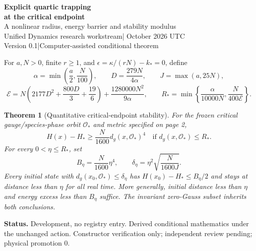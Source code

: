 \documentclass[11pt,a4paper]{article}
\newtheorem{theorem}{Theorem}\newtheorem{lemma}[theorem]{Lemma}
\begin{document}
\begin{center}
{\Large\bfseries Explicit quartic trapping\\at the critical endpoint}\\[10pt]
{\large A nonlinear radius, energy barrier and stability modulus}\\[10pt]
Unified Dynamics research workstream\quad | October 2026 UTC\\
Version 0.1\quad |\quad Computer-assisted conditional theorem
\end{center}
\begin{abstract}
At the zero-offset critical orbit, three missing quadratic directions are stabilized by the frozen positive relaxed quartic. We convert that qualitative statement into explicit orbit-distance coercivity on the full fixed-norm phase space, at every finite rank. Two new rigorous matrix bounds control the fast scalar Hessian and the metric size of critical coordinates. Global fourth and fifth geodesic derivatives, polarization and a quantitative completion of the fast variables give an explicit radius without requiring a numerical gauge-slice chart radius. The conserved-energy barrier then gives an initial perturbation modulus proportional to the square of the target distance. The constants are conservative sufficient guarantees in a declared mathematical metric.
\end{abstract}
For $a,N>0$, finite $r\ge1$, and $\epsilon=\kappa/(rN)-k_*=0$, define
\[
\alpha=\min\left(\frac a2,\frac N{100}\right),\qquad
D=\frac{279N}{4\alpha},\qquad J=\max(a,25N),
\]
\[
\mathcal E=N\left(2177D^2+\frac{800D}{3}+\frac{19}{6}\right)
+\frac{1280000N^2}{9\alpha},\qquad
\boxed{R_* =\min\left\{\frac{\alpha}{10000N},\frac{N}{400\mathcal E}\right\}.}
\]
\begin{theorem}[Quantitative critical-endpoint stability]\label{th:main}
For the frozen critical gauge/species-phase orbit $\mathcal O_*$ and metric specified on page 2,
\[
\boxed{H(x)-H_*\ge\frac N{1600}d_g(x,\mathcal O_*)^4
\quad\text{if }d_g(x,\mathcal O_*)\le R_*.}
\]
For every $0<\eta\le R_*$, set
\[
\boxed{B_\eta=\frac N{1600}\eta^4,\qquad
\delta_\eta=\eta^2\sqrt{\frac{N}{1600J}}.}
\]
Every initial state with $d_g(x_0,\mathcal O_*)\le\delta_\eta$ has $H(x_0)-H_*\le B_\eta/2$ and stays at distance less than $\eta$ for all real time. More generally, initial distance less than $\eta$ and energy excess less than $B_\eta$ suffice. The invariant zero-Gauss subset inherits both conclusions.
\end{theorem}
\textbf{Status.} Development, no registry entry. Derived conditional mathematics under the unchanged action. Constructor verification only; independent review pending; physical promotion $0$.
\newpage
\end{document}
